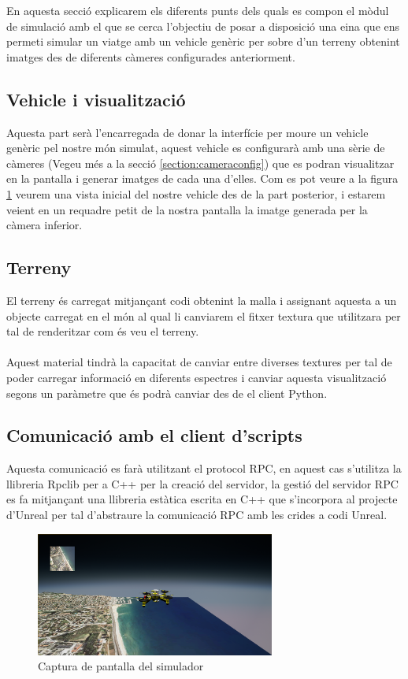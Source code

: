 \documentclass[10pt,a4paper]{article}
\begin{document}
En aquesta secció explicarem els diferents punts dels quals es compon el mòdul de simulació amb el que se cerca l'objectiu de posar a disposició una eina que ens permeti simular un viatge amb un vehicle genèric per sobre d'un terreny obtenint imatges des de diferents càmeres configurades anteriorment.

\subsection{Vehicle i visualització}
Aquesta part serà l'encarregada de donar la interfície per moure un vehicle genèric pel nostre món simulat, aquest vehicle es configurarà amb una sèrie de càmeres (Vegeu més a la secció \ref{section:cameraconfig}) que es podran visualitzar en la pantalla i generar imatges de cada una d'elles. Com es pot veure a la figura \ref{fig-screenshotsimulator} veurem una vista inicial del nostre vehicle des de la part posterior, i estarem veient en un requadre petit de la nostra pantalla la imatge generada per la càmera inferior.

\subsection{Terreny}
El terreny és carregat mitjançant codi obtenint la malla i assignant aquesta a un objecte carregat en el món al qual li canviarem el fitxer textura que utilitzara per tal de renderitzar com és veu el terreny. 
\\
\\
Aquest material tindrà la capacitat de canviar entre diverses textures per tal de poder carregar informació en diferents espectres i canviar aquesta visualització segons un paràmetre que és podrà canviar des de el client Python.

\subsection{Comunicació amb el client d'scripts}

Aquesta comunicació es farà utilitzant el protocol RPC, en aquest cas s'utilitza la llibreria Rpclib\cite{rpclib} per a C++ per la creació del servidor, la gestió del servidor RPC es fa mitjançant una llibreria estàtica escrita en C++ que s'incorpora al projecte d'Unreal per tal d'abstraure la comunicació RPC amb les crides a codi Unreal.

\begin{figure}[!h]
\centering
  	\includegraphics[width=0.7\textwidth]{simulator_example}
	\caption{Captura de pantalla del simulador}
	\label{fig-screenshotsimulator}
\end{figure}
\end{document}
